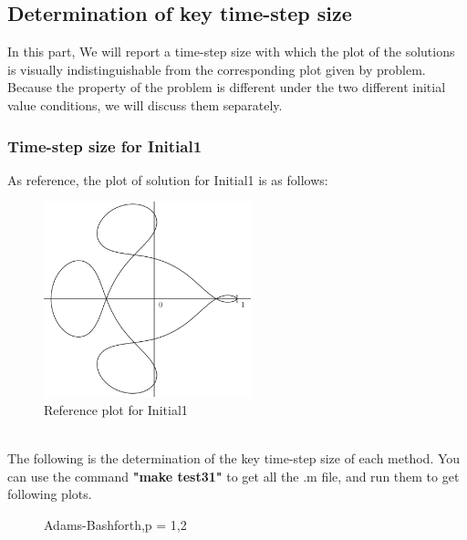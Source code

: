 \documentclass[a4paper,twocolumn]{article}
\theoremstyle{definition}
\begin{document}
\subsection{Determination of key time-step size}
In this part, We will report a time-step size with which the plot of the solutions is visually indistinguishable from the corresponding plot given by problem. Because the property of the problem is different under the two different initial value conditions, we will discuss them separately.
\subsubsection{Time-step size for Initial1}
As reference, the plot of solution for Initial1 is as follows:\\
\begin{figure}[!htp]   
	\centering
	\includegraphics[width=6cm]{Pictures/I1.png}
	\caption{Reference plot for Initial1}
	\label{fig:R1}
\end{figure}\\
\noindent The following is the determination of the key time-step size of each method. You can use the command \textbf{"make test31"} to get all the .m file, and run them to get following plots.
\begin{figure}[!htp] 
	\centering
	\caption{Adams-Bashforth,p = 1,2 }
	\label{AB1ks}
\end{figure}
\end{document}

